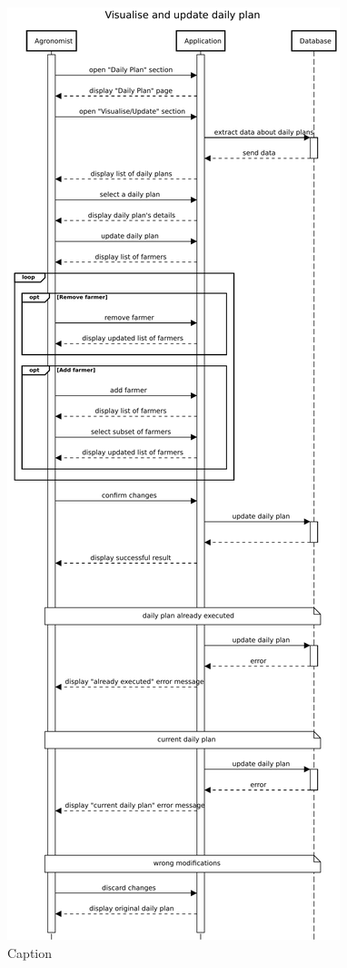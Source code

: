 \begin{figure}[H]
    \centering
    \includegraphics[scale=0.45]{Images/Sequence diagrams/Agronomist - visualise and update daily plan.pdf}
    \caption{Caption}
    \label{fig:my_label}
\end{figure}

